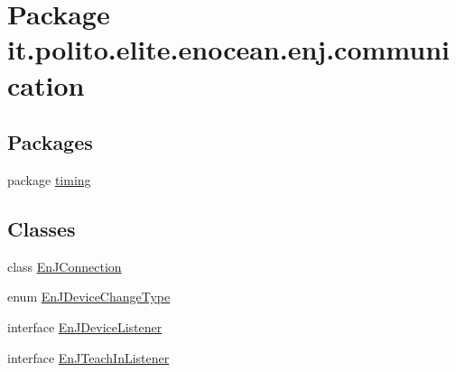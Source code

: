 \hypertarget{namespaceit_1_1polito_1_1elite_1_1enocean_1_1enj_1_1communication}{}\section{Package it.\+polito.\+elite.\+enocean.\+enj.\+communication}
\label{namespaceit_1_1polito_1_1elite_1_1enocean_1_1enj_1_1communication}
\subsection*{Packages}
\begin{DoxyCompactItemize}
\item 
package \hyperlink{namespaceit_1_1polito_1_1elite_1_1enocean_1_1enj_1_1communication_1_1timing}{timing}
\end{DoxyCompactItemize}
\subsection*{Classes}
\begin{DoxyCompactItemize}
\item 
class \hyperlink{classit_1_1polito_1_1elite_1_1enocean_1_1enj_1_1communication_1_1_en_j_connection}{En\+J\+Connection}
\item 
enum \hyperlink{enumit_1_1polito_1_1elite_1_1enocean_1_1enj_1_1communication_1_1_en_j_device_change_type}{En\+J\+Device\+Change\+Type}
\item 
interface \hyperlink{interfaceit_1_1polito_1_1elite_1_1enocean_1_1enj_1_1communication_1_1_en_j_device_listener}{En\+J\+Device\+Listener}
\item 
interface \hyperlink{interfaceit_1_1polito_1_1elite_1_1enocean_1_1enj_1_1communication_1_1_en_j_teach_in_listener}{En\+J\+Teach\+In\+Listener}
\end{DoxyCompactItemize}
